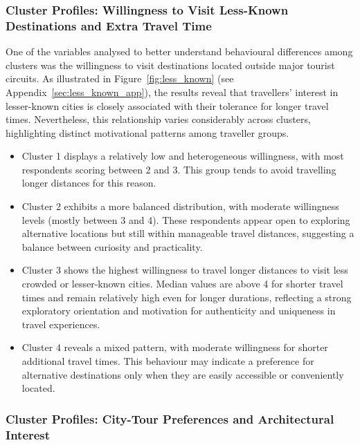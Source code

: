 \documentclass[a4paper, 12pt, twoside]{report}  %
\begin{document}
\subsubsection{Cluster Profiles: Willingness to Visit Less-Known Destinations and Extra Travel Time}

\indent One of the variables analysed to better understand behavioural differences among clusters was the willingness to visit destinations located outside major tourist circuits. As illustrated in Figure~\ref{fig:less_known} (see Appendix~\ref{sec:less_known_app}), the results reveal that travellers’ interest in lesser-known cities is closely associated with their tolerance for longer travel times. Nevertheless, this relationship varies considerably across clusters, highlighting distinct motivational patterns among traveller groups.

\begin{itemize}
\item Cluster 1 displays a relatively low and heterogeneous willingness, with most respondents scoring between 2 and 3. This group tends to avoid travelling longer distances for this reason.
\item Cluster 2 exhibits a more balanced distribution, with moderate willingness levels (mostly between 3 and 4). These respondents appear open to exploring alternative locations but still within manageable travel distances, suggesting a balance between curiosity and practicality.
\item Cluster 3 shows the highest willingness to travel longer distances to visit less crowded or lesser-known cities. Median values are above 4 for shorter travel times and remain relatively high even for longer durations, reflecting a strong exploratory orientation and motivation for authenticity and uniqueness in travel experiences.
\item Cluster 4 reveals a mixed pattern, with moderate willingness for shorter additional travel times. This behaviour may indicate a preference for alternative destinations only when they are easily accessible or conveniently located.
\end{itemize}

\subsubsection{Cluster Profiles: City-Tour Preferences and Architectural Interest}
\end{document}
